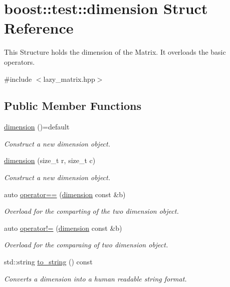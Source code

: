 \hypertarget{structboost_1_1test_1_1dimension}{}\section{boost\+::test\+::dimension Struct Reference}
\label{structboost_1_1test_1_1dimension}


This Structure holds the dimension of the Matrix. It overloads the basic operators.  




{\ttfamily \#include $<$lazy\+\_\+matrix.\+hpp$>$}

\subsection*{Public Member Functions}
\begin{DoxyCompactItemize}
\item 
\mbox{\hyperlink{structboost_1_1test_1_1dimension_a994469ba24de50ea73d852cc92b80bd4}{dimension}} ()=default
\begin{DoxyCompactList}\small\item\em Construct a new dimension object. \end{DoxyCompactList}\item 
\mbox{\hyperlink{structboost_1_1test_1_1dimension_a550aa7f36f42fb470ccffd6c8c11dabb}{dimension}} (size\+\_\+t r, size\+\_\+t c)
\begin{DoxyCompactList}\small\item\em Construct a new dimension object. \end{DoxyCompactList}\item 
auto \mbox{\hyperlink{structboost_1_1test_1_1dimension_ad780c612257d89320f485ee3708620cc}{operator==}} (\mbox{\hyperlink{structboost_1_1test_1_1dimension}{dimension}} const \&b)
\begin{DoxyCompactList}\small\item\em Overload for the comparting of the two dimension object. \end{DoxyCompactList}\item 
auto \mbox{\hyperlink{structboost_1_1test_1_1dimension_ac1ffbf35ade4a10609b393c62dd5a8c2}{operator!=}} (\mbox{\hyperlink{structboost_1_1test_1_1dimension}{dimension}} const \&b)
\begin{DoxyCompactList}\small\item\em Overload for the comparaing of two dimension object. \end{DoxyCompactList}\item 
std\+::string \mbox{\hyperlink{structboost_1_1test_1_1dimension_a0ab6b006f11c653d8a4221a1523714a6}{to\+\_\+string}} () const
\begin{DoxyCompactList}\small\item\em Converts a dimension into a human readable string format. \end{DoxyCompactList}\end{DoxyCompactItemize}
